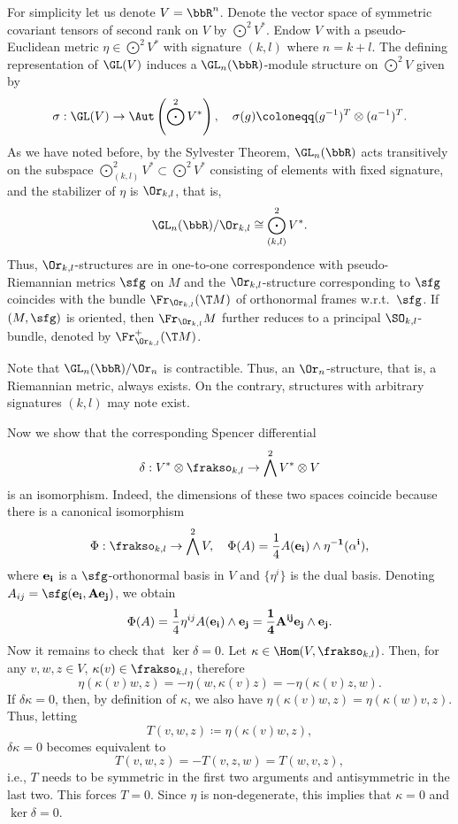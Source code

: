 \begin{example}\label{ex pseudo-riemannian structure}
    For simplicity let us denote $V=\bbR^n$. Denote the vector space of symmetric covariant tensors of second rank on $V$ by $\bigodot^2V^\ast$. Endow $V$ with a pseudo-Euclidean metric $\eta\in \bigodot^2V^\ast$ with signature $(k,l)$ where $n=k+l$. The defining representation of $\GL(V)$ induces a $\GL_n(\bbR)$-module structure on $\bigodot^2 V$ given by 
    \[\sigma:\GL(V)\to \Aut\left(\bigodot^2 V^\ast\right),\quad \sigma(g)\coloneqq (g^{-1})^T\otimes (a^{-1})^T.\label{eq 2.2.21 RS2}\]
    As we have noted before, by the Sylvester Theorem, $\GL_n(\bbR)$ acts transitively on the subspace $\bigodot^2_{(k,l)}V^\ast\subset \bigodot^2 V^\ast$ consisting of elements with fixed signature, and the stabilizer of $\eta$ is $\Or_{k,l}$, that is,
    \[\GL_n(\bbR)\slash \Or_{k,l}\cong \bigodot^2_{(k,l)}V^\ast.\]
    Thus, $\Or_{k,l}$-structures are in one-to-one correspondence with pseudo-Riemannian metrics $\sfg$ on $M$ and the $\Or_{k,l}$-structure corresponding to $\sfg$ coincides with the bundle $\Fr_{\Or_{k,l}}(\T M)$ of orthonormal frames w.r.t.\ $\sfg$. If $(M,\sfg)$ is oriented, then $\Fr_{\Or_{k,l}}M$ further reduces to a principal $\SO_{k,l}$-bundle, denoted by $\Fr^+_{\Or_{k,l}}(\T M)$. 
    
    Note that $\GL_n(\bbR)\slash \Or_n$ is contractible. Thus, an $\Or_n$-structure, that is, a Riemannian metric, always exists. On the contrary, structures with arbitrary signatures $(k,l)$ may note exist. 
    
    Now we show that the corresponding Spencer differential 
    \[\delta: V^\ast\otimes \frakso_{k,l}\to \bigwedge^2 V^\ast\otimes V\]
    is an isomorphism. Indeed, the dimensions of these two spaces coincide because there is a canonical isomorphism 
    \[\Phi: \frakso_{k,l}\to \bigwedge^2 V,\quad \Phi(A)= \frac14 A(\bf{e}_i)\wedge \eta^{-1}(\alpha^i),\]
    where $\bf{e}_i$ is a $\sfg$-orthonormal basis in $V$ and $\{\eta^i\}$ is the dual basis. Denoting $A_{ij}=\sfg(\bf{e}_i,A\bf{e}_j)$, we obtain 
    \[\Phi(A)=\frac14 \eta^{ij}A(\bf{e}_i)\wedge\bf{e}_j=\frac14 A^{ij}\bf{e}_j\wedge\bf{e}_j.\]
    Now it remains to check that $\ker\delta=0$. Let $\kappa\in \Hom(V,\frakso_{k,l})$. Then, for any $v,w,z\in V$, $\kappa(v)\in\frakso_{k,l}$, therefore 
    \[\eta(\kappa(v)w,z)=-\eta(w,\kappa(v)z)=-\eta(\kappa(v)z,w).\]
    If $\delta\kappa=0$, then, by definition of $\kappa$, we  also have $\eta(\kappa(v)w,z)=\eta(\kappa(w)v,z)$. Thus, letting
    \[T(v,w,z)\coloneqq \eta(\kappa(v)w,z),\]
    $\delta\kappa=0$ becomes equivalent to 
    \[T(v,w,z)=-T(v,z,w)=T(w,v,z),\]
    i.e., $T$ needs to be symmetric in the first two arguments and antisymmetric in the last two. This forces $T=0$. Since $\eta$ is non-degenerate, this implies that $\kappa=0$ and $\ker\delta=0$. 
    

\end{example}

